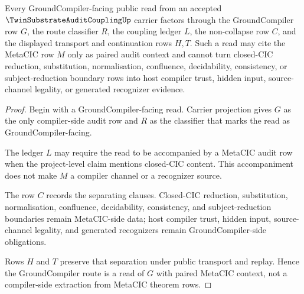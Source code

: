 \begin{theorem}
\label{thm:twin-substrate-audit-coupling-groundcompiler-route}
Every GroundCompiler-facing public read from an accepted $\TwinSubstrateAuditCouplingUp$ carrier factors through the GroundCompiler row $G$, the route classifier $R$, the coupling ledger $L$, the non-collapse row $C$, and the displayed transport and continuation rows $H,T$. Such a read may cite the MetaCIC row $M$ only as paired audit context and cannot turn closed-CIC reduction, substitution, normalisation, confluence, decidability, consistency, or subject-reduction boundary rows into host compiler trust, hidden input, source-channel legality, or generated recognizer evidence.
\end{theorem}
\begin{proof}
Begin with a GroundCompiler-facing read. Carrier projection gives $G$ as the only compiler-side audit row and $R$ as the classifier that marks the read as GroundCompiler-facing.

The ledger $L$ may require the read to be accompanied by a MetaCIC audit row when the project-level claim mentions closed-CIC content. This accompaniment does not make $M$ a compiler channel or a recognizer source.

The row $C$ records the separating clauses. Closed-CIC reduction, substitution, normalisation, confluence, decidability, consistency, and subject-reduction boundaries remain MetaCIC-side data; host compiler trust, hidden input, source-channel legality, and generated recognizers remain GroundCompiler-side obligations.

Rows $H$ and $T$ preserve that separation under public transport and replay. Hence the GroundCompiler route is a read of $G$ with paired MetaCIC context, not a compiler-side extraction from MetaCIC theorem rows.
\end{proof}

